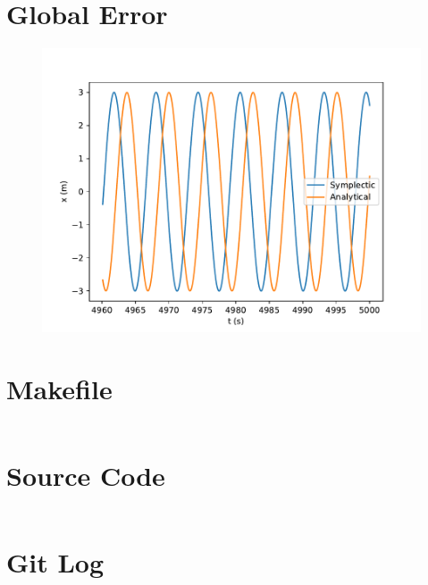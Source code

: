 \documentclass{article}
\begin{document}
    

\section{Global Error}
    \begin{figure}[h!]
        \centering
        \includegraphics[scale=0.6]{error.pdf}	
        \label{error}
    \end{figure}
        
    

\break
\section{Makefile}
	\inputminted{make}{Makefile}

\section{Source Code}
	\inputminted{python}{phase.py}

\section{Git Log}
    
\end{document}
